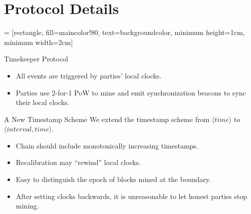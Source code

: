 \section{Protocol Details}

 = [rectangle, fill=maincolor!80, text=backgroundcolor, minimum height=1cm, minimum width=2cm]

\begin{frame}{Timekeeper Protocol} \centering
    

    \begin{itemize}
        \item<2-> All events are triggered by parties' local clocks.
        \item<3-> Parties use 2-for-1 PoW to mine and emit synchronization beacons to sync their local clocks.
    \end{itemize}
\end{frame}

\begin{frame}{A New Timestamp Scheme}
    We extend the timestamp scheme from $\langle time \rangle$ to $\langle interval, time \rangle$.

    \centering 

    \begin{itemize}
        \item<2-> Chain should include monotonically increasing timestamps.
        \item<3-> Recalibration may ``rewind'' local clocks.
        \item<4-> Easy to distinguish the epoch of blocks mined at the boundary.
        \item<5-> After setting clocks backwards, it is unreasonable to let honest parties stop mining.
    \end{itemize}
\end{frame}

